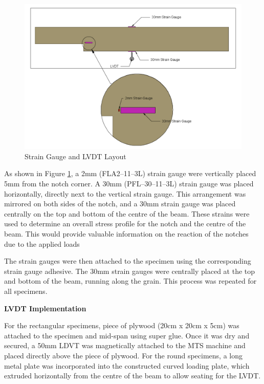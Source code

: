 \documentclass[11pt,a4paper]{article}
\numberwithin{equation}{subsection}
\begin{document}
\begin{figure}[h]
	\begin{center}
		\includegraphics[scale=0.4]{Gauge_Set_Up}
	\end{center}
	\caption{Strain Gauge and LVDT Layout}
	\label{fig:Gauge}
\end{figure}
\noindent
As shown in Figure \ref{fig:Gauge}, a 2mm (FLA2--11--3L) strain gauge were vertically placed 5mm from the notch corner. A 30mm (PFL--30--11--3L) strain gauge was placed horizontally, directly next to the vertical strain gauge. This arrangement was mirrored on both sides of the notch, and a 30mm strain gauge was placed centrally on the top and bottom of the centre of the beam. These strains were used to determine an overall stress profile for the notch and the centre of the beam. This would provide valuable information on the reaction of the notches due to the applied loads

\vspace*{\baselineskip}

\noindent
The strain gauges were then attached to the specimen using the corresponding strain gauge adhesive. The 30mm strain gauges were centrally placed at the top and bottom of the beam, running along the grain. This process was repeated for all specimens.

\pagebreak

\noindent
\textbf{LVDT Implementation}\par
\noindent
For the rectangular specimens, piece of plywood (20cm x 20cm x 5cm) was attached to the specimen and mid-span using super glue. Once it was dry and secured, a 50mm LDVT was magnetically attached to the MTS machine and placed directly above the piece of plywood. For the round specimens, a long metal plate was incorporated into the constructed curved loading plate, which extruded horizontally from the centre of the beam to allow seating for the LVDT.
\end{document}
